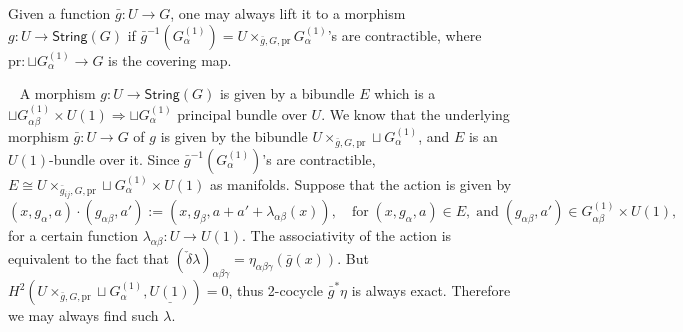 \documentclass[letterpaper,10pt, oneside]{article} %
\newcommand{\String}{\mathsf{String}}%
\newcommand{\pf}{\noindent{\bf Proof.}\ }
\def\qed{\hfill ~\vrule height6pt width6pt depth0pt}
\newcommand{\pr}{\mathrm{pr}}
\newcommand{\bg}{\bar{g}}
\begin{document}
\begin{lemma}\label{lem:lift-g}
Given a function $\bar{g}: U \to G$, one may always lift it to a
morphism $g:U\to \String(G)$ if $\bar{g}^{-1}(G^{(1)}_\alpha)=U\times_{\bg,
  G, \pr} G^{(1)}_\alpha$'s are contractible, where $\pr: \sqcup G^{(1)}_\alpha \to
G$ is the covering map.
\end{lemma}
\pf
A morphism $g:U\to \String(G)$ is given by a bibundle $E$ which is a
$\sqcup G^{(1)}_{\alpha \beta} \times U(1) \Rightarrow \sqcup G^{(1)}_{\alpha}$
principal bundle over $U$. We know that the underlying morphism $\bg: U \to
G$ of $g$ is given by the bibundle
$U\times_{\bar{g}, G, \pr} \sqcup G^{(1)}_{\alpha}$, and $E$ is an
$U(1)$-bundle over it. Since $\bar{g}^{-1}(G^{(1)}_\alpha)$'s are contractible, $E\cong U\times_{\bar{g}_{ij}, G, \pr}
\sqcup G^{(1)}_\alpha \times U(1)$ as manifolds.      Suppose that the action is given by
\[ (x, g_\alpha, a) \cdot (g_{\alpha\beta}, a') := (x, g_\beta, a+a'
+ \lambda_{\alpha \beta} (x) ), \quad \text{for}\; (x, g_\alpha, a) \in E,\; \text{and} \;
(g_{\alpha\beta}, a') \in G^{(1)}_{\alpha \beta} \times U(1),  \]
for a certain function $\lambda_{\alpha\beta}: U \to U(1) $. The
associativity of the action is equivalent to the fact that $(\check{\delta}
\lambda)_{\alpha\beta\gamma} =
\eta_{\alpha\beta\gamma}(\bg(x))$. But $H^2(
U\times_{\bar{g}, G, \pr} \sqcup G^{(1)}_{\alpha}, \underline{U(1)}) =0$, thus 2-cocycle
$\bar{g}^*\eta$ is always exact. Therefore we may always find such
$\lambda$.
\qed\vspace{3mm}
\end{document}
